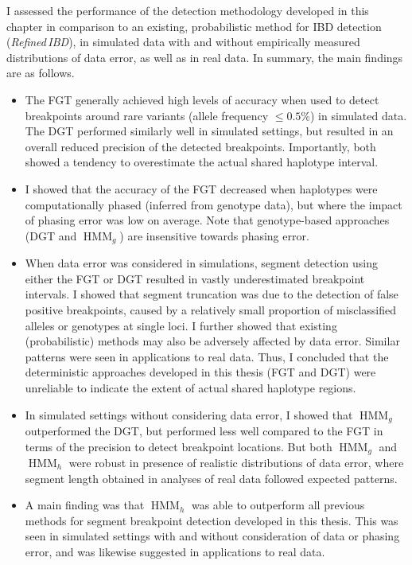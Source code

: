 I assessed the performance of the detection methodology developed in this chapter in comparison to an existing, probabilistic method for IBD detection (\emph{Refined\,IBD}), in simulated data with and without empirically measured distributions of data error, as well as in real data.
In summary, the main findings are as follows.
\begin{itemize}
\item%
The FGT generally achieved high levels of accuracy when used to detect breakpoints around rare variants (allele frequency $\leq 0.5\%$) in simulated data.
The DGT performed similarly well in simulated settings, but resulted in an overall reduced precision of the detected breakpoints.
Importantly, both showed a tendency to overestimate the actual shared haplotype interval.
\item%
I showed that the accuracy of the FGT decreased when haplotypes were computationally phased (inferred from genotype data), but where the impact of phasing error was low on average.
Note that genotype-based approaches (DGT and $\operatorname{HMM}_g$) are insensitive towards phasing error.
\item%
When data error was considered in simulations, segment detection using either the FGT or DGT resulted in vastly underestimated breakpoint intervals.
I showed that segment truncation was due to the detection of false positive breakpoints, caused by a relatively small proportion of misclassified alleles or genotypes at single loci.
I further showed that existing (probabilistic) methods may also be adversely affected by data error.
Similar patterns were seen in applications to real data.
Thus, I concluded that the deterministic approaches developed in this thesis (FGT and DGT) were unreliable to indicate the extent of actual shared haplotype regions.
\item%
In simulated settings without considering data error, I showed that $\operatorname{HMM}_g$ outperformed the DGT, but performed less well compared to the FGT in terms of the precision to detect breakpoint locations.
But both $\operatorname{HMM}_g$ and $\operatorname{HMM}_h$ were robust in presence of realistic distributions of data error, where segment length obtained in analyses of real data followed expected patterns.
\item%
A main finding was that $\operatorname{HMM}_h$ was able to outperform all previous methods for segment breakpoint detection developed in this thesis.
This was seen in simulated settings with and without consideration of data or phasing error, and was likewise suggested in applications to real data.
\end{itemize}

